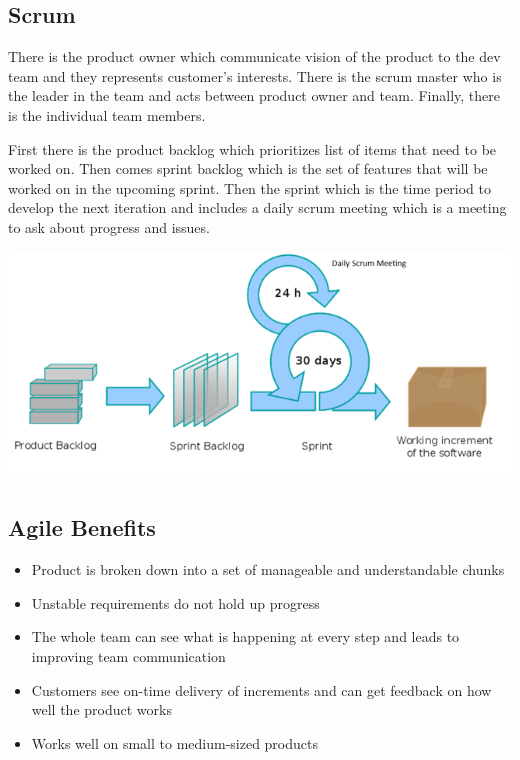 \documentclass{article}
\begin{document}
    \subsection*{Scrum}

    There is the product owner which communicate vision of the product to the dev team 
    and they represents customer's interests. There is the scrum master who is the 
    leader in the team and acts between product owner and team. Finally, there is the 
    individual team members.

    First there is the product backlog which prioritizes list of items that need to be
    worked on. Then comes sprint backlog which is the set of features that will 
    be worked on in the upcoming sprint. Then the sprint which is the time period to
    develop the next iteration and includes a daily scrum meeting which is a meeting to 
    ask about progress and issues.

    \begin{center}
        \includegraphics[scale=0.6]{Scrum.png}
    \end{center}

    \subsection*{Agile Benefits}

    \begin{itemize}
        \item 
        Product is broken down into a set of manageable and understandable chunks
        \item
        Unstable requirements do not hold up progress
        \item
        The whole team can see what is happening at every step and leads to improving team communication
        \item
        Customers see on-time delivery of increments and can get feedback on how well the product works
        \item
        Works well on small to medium-sized products
    \end{itemize}
\end{document}
